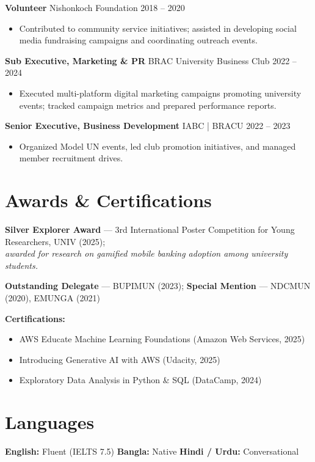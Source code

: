 \documentclass[10pt,a4paper]{article}
\newenvironment{project}{
    \begin{itemize}[leftmargin=1.0em, itemsep=1pt, topsep=1pt, parsep=1pt]
}{
    \end{itemize}
}
\begin{document}
\noindent\textbf{Volunteer} \textbar{} Nishonkoch Foundation \hfill 2018 -- 2020
\begin{project}
    \item Contributed to community service initiatives; assisted in developing social media fundraising campaigns and coordinating outreach events.
\end{project}
\vspace{4pt}

\noindent\textbf{Sub Executive, Marketing \& PR} \textbar{} BRAC University Business Club \hfill 2022 -- 2024
\begin{project}
    \item Executed multi-platform digital marketing campaigns promoting university events; tracked campaign metrics and prepared performance reports.
\end{project}
\vspace{4pt}

\noindent\textbf{Senior Executive, Business Development} \textbar{} IABC | BRACU \hfill 2022 -- 2023
\begin{project}
    \item Organized Model UN events, led club promotion initiatives, and managed member recruitment drives.
\end{project}

\section*{Awards \& Certifications}

\noindent\textbf{Silver Explorer Award} --- 3rd International Poster Competition for Young Researchers, UNIV (2025);\\
\textit{awarded for research on gamified mobile banking adoption among university students.}
\vspace{4pt}

\noindent\textbf{Outstanding Delegate} --- BUPIMUN (2023); \textbf{Special Mention} --- NDCMUN (2020), EMUNGA (2021)
\vspace{6pt}

\noindent\textbf{Certifications:}
\begin{itemize}
    \item AWS Educate Machine Learning Foundations (Amazon Web Services, 2025)
    \item Introducing Generative AI with AWS (Udacity, 2025)
    \item Exploratory Data Analysis in Python \& SQL (DataCamp, 2024)
\end{itemize}

\section*{Languages}
\textbf{English:} Fluent (IELTS 7.5) \quad \textbf{Bangla:} Native \quad \textbf{Hindi / Urdu:} Conversational
\end{document}
